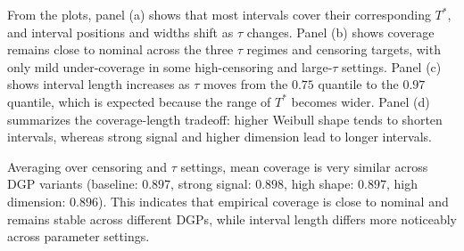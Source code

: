 \documentclass[11pt]{article}
\begin{document}
From the plots, panel (a) shows that most intervals cover their corresponding $T^*$,
and interval positions and widths shift as $\tau$ changes.
Panel (b) shows coverage remains close to nominal across the three $\tau$ regimes and
censoring targets, with only mild under-coverage in some high-censoring and large-$\tau$
settings. Panel (c) shows interval length increases as $\tau$ moves from the $0.75$
quantile to the $0.97$ quantile, which is expected because the range of $T^*$ becomes
wider. Panel (d) summarizes the coverage-length tradeoff: higher Weibull shape tends to shorten intervals, whereas strong signal and higher
dimension lead to longer intervals.

Averaging over censoring and $\tau$ settings, mean coverage is very similar across DGP
variants (baseline: $0.897$, strong signal: $0.898$, high shape: $0.897$,
high dimension: $0.896$). This indicates that empirical coverage is close to nominal and remains stable across different DGPs, while interval length differs more noticeably across parameter settings.
\end{document}
